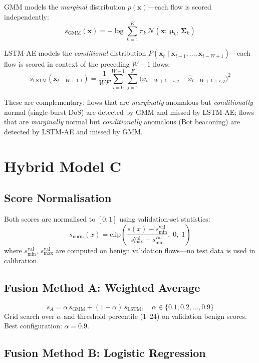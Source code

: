 \documentclass[conference]{IEEEtran}
\begin{document}
GMM models the \emph{marginal} distribution $p(\mathbf{x})$---each flow
is scored independently:
\[
s_{\text{GMM}}(\mathbf{x}) = -\log \sum_{k=1}^{K} \pi_k\,
  \mathcal{N}(\mathbf{x};\,\boldsymbol{\mu}_k,\,\boldsymbol{\Sigma}_k)
\]

LSTM-AE models the \emph{conditional} distribution
$P(\mathbf{x}_t \mid \mathbf{x}_{t-1},\ldots,\mathbf{x}_{t-W+1})$---each
flow is scored in context of the preceding $W-1$ flows:
\[
s_{\text{LSTM}}(\mathbf{x}_{t-W+1:t}) =
  \frac{1}{WF}\sum_{i=0}^{W-1}\sum_{j=1}^{F}
  \bigl(x_{t-W+1+i,j} - \hat{x}_{t-W+1+i,j}\bigr)^2
\]

These are complementary: flows that are \emph{marginally} anomalous but
\emph{conditionally} normal (single-burst DoS) are detected by GMM and
missed by LSTM-AE; flows that are \emph{marginally} normal but
\emph{conditionally} anomalous (Bot beaconing) are detected by LSTM-AE
and missed by GMM.

\section{Hybrid Model C}

\subsection{Score Normalisation}

Both scores are normalised to $[0,1]$ using validation-set statistics:
\[
s_{\text{norm}}(x) = \text{clip}\!\left(
  \frac{s(x) - s_{\min}^{\text{val}}}{s_{\max}^{\text{val}} - s_{\min}^{\text{val}}},\;0,\;1
\right)
\]
where $s_{\min}^{\text{val}},\,s_{\max}^{\text{val}}$ are computed on
benign validation flows---no test data is used in calibration.

\subsection{Fusion Method A: Weighted Average}

\[
s_A = \alpha\,s_{\text{GMM}} + (1-\alpha)\,s_{\text{LSTM}},\quad
\alpha\in\{0.1,0.2,\ldots,0.9\}
\]
Grid search over $\alpha$ and threshold percentile (1--24) on
validation benign scores. Best configuration: $\alpha=0.9$.

\subsection{Fusion Method B: Logistic Regression}
\end{document}
